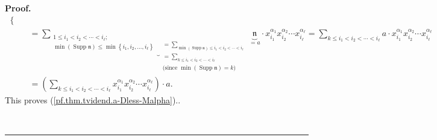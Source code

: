 \documentclass
[numbers=enddot,12pt,final,onecolumn,notitlepage,abstracton]{scrartcl}%
\theoremstyle{definition}
\newenvironment{proof}[1][Proof]{\noindent\textbf{#1.} }{\ \rule{0.5em}{0.5em}}
\newenvironment{verlong}{}{}
\let\sumnonlimits\sum
\renewcommand{\sum}{\sumnonlimits\limits}
\begin{document}
\begin{verlong}
\begin{proof}
{\begin{align*}
\begin{cases}
\end{cases}
\\
&  =\underbrace{\sum_{\substack{1\leq i_{1}<i_{2}<\cdots<i_{\ell}%
;\\\min\left(  \operatorname*{Supp}\mathfrak{n}\right)  \leq\min\left\{
i_{1},i_{2},\ldots,i_{\ell}\right\}  }}}_{\substack{=\sum_{\min\left(
\operatorname*{Supp}\mathfrak{n}\right)  \leq i_{1}<i_{2}<\cdots<i_{\ell}%
}\\=\sum_{k\leq i_{1}<i_{2}<\cdots<i_{\ell}}\\\text{(since }\min\left(
\operatorname*{Supp}\mathfrak{n}\right)  =k\text{)}}}\underbrace{\mathfrak{n}%
}_{=a}\cdot x_{i_{1}}^{\alpha_{1}}x_{i_{2}}^{\alpha_{2}}\cdots x_{i_{\ell}%
}^{\alpha_{\ell}}=\sum_{k\leq i_{1}<i_{2}<\cdots<i_{\ell}}a\cdot x_{i_{1}%
}^{\alpha_{1}}x_{i_{2}}^{\alpha_{2}}\cdots x_{i_{\ell}}^{\alpha_{\ell}}\\
&  =\left(  \sum_{k\leq i_{1}<i_{2}<\cdots<i_{\ell}}x_{i_{1}}^{\alpha_{1}%
}x_{i_{2}}^{\alpha_{2}}\cdots x_{i_{\ell}}^{\alpha_{\ell}}\right)  \cdot a.
\end{align*}
This proves (\ref{pf.thm.tvidend.a-Dless-Malpha}).}.


\end{proof}
\end{verlong}
\end{document}
